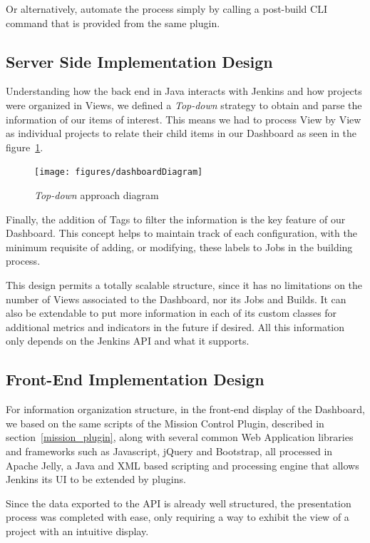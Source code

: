 \documentclass[9pt,a4paper]{extarticle}
\begin{document}
\begin{multicols}{2}
Or alternatively, automate the process simply by calling a post-build CLI command that is provided from the same plugin.

\subsection{Server Side Implementation Design}\label{sc:implementationDesign}

Understanding how the back end in Java interacts with Jenkins and how projects were organized in Views, we defined a \textit{Top-down} strategy to obtain and parse the information of our items of interest.
This means we had to process View by View as individual projects to relate their child items in our Dashboard as seen in the figure~\ref{fig:dashboardDiagram}.

\begin{figure}[H]
\centerline{\texttt{[image: figures/dashboardDiagram]}}
\caption{\textit{Top-down} approach diagram}  
\label{fig:dashboardDiagram}
\end{figure}

Finally, the addition of Tags to filter the information is the key feature of our Dashboard. This concept helps to maintain track of each configuration, with the minimum requisite of adding, or modifying, these labels to Jobs in the building process.

This design permits a totally scalable structure, since it has no limitations on the number of Views associated to the Dashboard, nor its Jobs and Builds. It can also be extendable to put more information in each of its custom classes for additional metrics and indicators in the future if desired. All this information only depends on the Jenkins API and what it supports.

\subsection{Front-End Implementation Design}\label{sc:frontend}

For information organization structure, in the front-end display of the Dashboard, we based on the same scripts of the Mission Control Plugin, described in section~\ref{mission_plugin}, along with several common Web Application libraries and frameworks such as Javascript, jQuery and Bootstrap, all processed in Apache Jelly, a Java and XML based scripting and processing engine that allows Jenkins its UI to be extended by plugins.

Since the data exported to the API is already well structured, the presentation process was completed with ease, only requiring a way to exhibit the view of a project with an intuitive display. 


\end{multicols}
\end{document}
